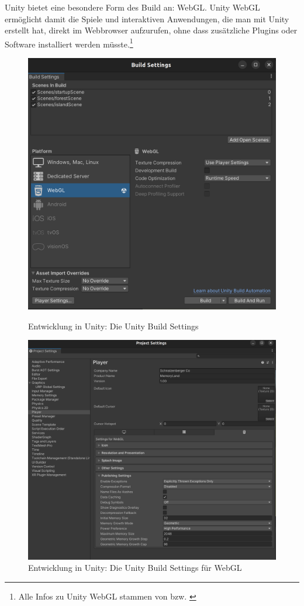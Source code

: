 Unity bietet eine besondere Form des Build an: WebGL. Unity WebGL ermöglicht damit die Spiele und interaktiven Anwendungen, die man mit Unity erstellt hat, direkt im Webbrowser aufzurufen, ohne dass zusätzliche Plugins oder Software installiert werden müsste.\footnote{Alle Infos zu Unity WebGL stammen von \cite{UnityDocsWebGL} bzw. \cite{WebGL}}


\begin{figure}
    \centering
    \includegraphics[scale=0.12]{pics/unity-bulid-settings.png}
    \caption{Entwicklung in Unity: Die Unity Build Settings}
    \label{fig:unity-build-settings}

    \vspace{1cm}

    \centering
    \includegraphics[scale=0.09]{pics/unity-build-webgl-settings.png}
    \caption{Entwicklung in Unity: Die Unity Build Settings für WebGL}
    \label{fig:unity-build-webgl-settings}
\end{figure}
